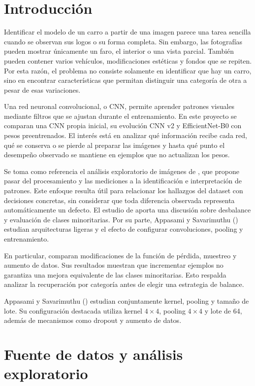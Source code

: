 \documentclass[conference]{IEEEtran}
\begin{document}
\section{Introducción}

Identificar el modelo de un carro a partir de una imagen parece una tarea sencilla cuando se observan sus logos o su forma completa. Sin embargo, las fotografías pueden mostrar únicamente un faro, el interior o una vista parcial. También pueden contener varios vehículos, modificaciones estéticas y fondos que se repiten. Por esta razón, el problema no consiste solamente en identificar que hay un carro, sino en encontrar características que permitan distinguir una categoría de otra a pesar de esas variaciones.

Una red neuronal convolucional, o CNN, permite aprender patrones visuales mediante filtros que se ajustan durante el entrenamiento. En este proyecto se comparan una CNN propia inicial, su evolución CNN v2 y EfficientNet-B0 con pesos preentrenados. El interés está en analizar qué información recibe cada red, qué se conserva o se pierde al preparar las imágenes y hasta qué punto el desempeño observado se mantiene en ejemplos que no actualizan los pesos.

Se toma como referencia el análisis exploratorio de imágenes de \citet{zhang2024}, que propone pasar del procesamiento y las mediciones a la identificación e interpretación de patrones. Este enfoque resulta útil para relacionar los hallazgos del dataset con decisiones concretas, sin considerar que toda diferencia observada representa automáticamente un defecto. El estudio de \citet{khan2026} aporta una discusión sobre desbalance y evaluación de clases minoritarias. Por su parte, Appasami y Savarimuthu (\citeyear{appasami2025}) estudian arquitecturas ligeras y el efecto de configurar convoluciones, pooling y entrenamiento.

En particular, \citet{khan2026} comparan modificaciones de la función de pérdida, muestreo y aumento de datos. Sus resultados muestran que incrementar ejemplos no garantiza una mejora equivalente de las clases minoritarias. Esto respalda analizar la recuperación por categoría antes de elegir una estrategia de balance.

Appasami y Savarimuthu (\citeyear{appasami2025}) estudian conjuntamente kernel, pooling y tamaño de lote. Su configuración destacada utiliza kernel $4\times4$, pooling $4\times4$ y lote de 64, además de mecanismos como dropout y aumento de datos.

\section{Fuente de datos y análisis exploratorio}
\end{document}

